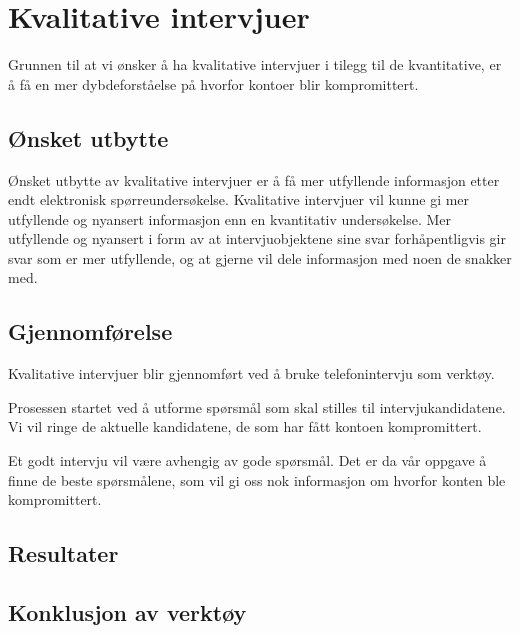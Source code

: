 \section{Kvalitative intervjuer}
Grunnen til at vi ønsker å ha kvalitative intervjuer i tilegg til de kvantitative, er å få en mer dybdeforståelse på hvorfor kontoer blir kompromittert. 

\subsection{Ønsket utbytte}
Ønsket utbytte av kvalitative intervjuer er å få mer utfyllende informasjon etter endt elektronisk spørreundersøkelse. Kvalitative intervjuer vil kunne gi mer utfyllende og nyansert informasjon enn en kvantitativ undersøkelse. Mer utfyllende og nyansert i form av at intervjuobjektene sine svar forhåpentligvis gir svar som er mer utfyllende, og at gjerne vil dele informasjon med noen de snakker med.

\subsection{Gjennomførelse}
Kvalitative intervjuer blir gjennomført ved å bruke telefonintervju som verktøy. 

Prosessen startet ved å utforme spørsmål som skal stilles til intervjukandidatene. Vi vil ringe de aktuelle kandidatene, de som har fått kontoen kompromittert. 

Et godt intervju vil være avhengig av gode spørsmål. Det er da vår oppgave å finne de beste spørsmålene, som vil gi oss nok informasjon om hvorfor konten ble kompromittert.  

\subsection{Resultater}


\subsection{Konklusjon av verktøy}
